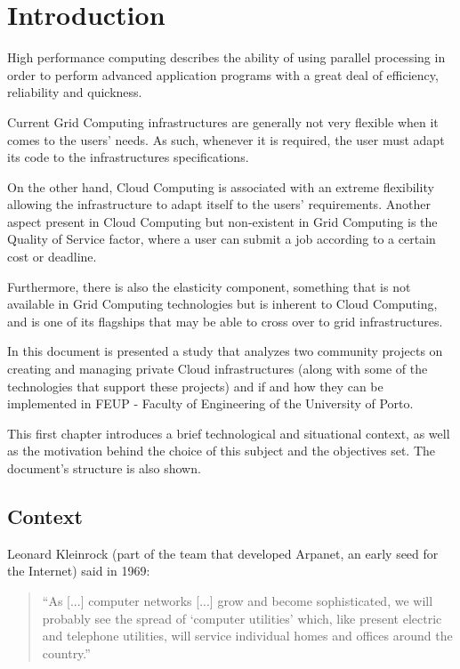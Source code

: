\chapter{Introduction} \label{chap:intro}

High performance computing describes the ability of using parallel processing in order to perform advanced application programs with a great deal of efficiency, reliability and quickness. \cite{hpclinux}

Current Grid Computing infrastructures are generally not very flexible when it comes to the users' needs. As such, whenever it is required, the user must adapt its code to the infrastructures specifications.

On the other hand, Cloud Computing is associated with an extreme flexibility allowing the infrastructure to adapt itself to the users' requirements. Another aspect present in Cloud Computing but non-existent in Grid Computing is the Quality of Service factor, where a user can submit a job according to a certain cost or deadline.

Furthermore, there is also the elasticity component, something that is not available in Grid Computing technologies but is inherent to Cloud Computing, and is one of its flagships that may be able to cross over to grid infrastructures.

In this document is presented a study that analyzes two community projects on creating and managing private Cloud infrastructures (along with some of the technologies that support these projects) and if and how they can be implemented in FEUP - Faculty of Engineering of the University of Porto.

This first chapter introduces a brief technological and situational context, as well as the motivation behind the choice of this subject and the objectives set. The document's structure is also shown.

\section{Context} \label{sec:context}

Leonard Kleinrock (part of the team that developed Arpanet, an early seed for the Internet) said in 1969:

\begin{quote}
  ``As [...] computer networks [...] grow and become sophisticated, we will probably see the spread of `computer utilities' which, like present electric and telephone utilities, will service individual homes and offices around the country.''~\cite{Buyya2009599} 
\end{quote}
	

